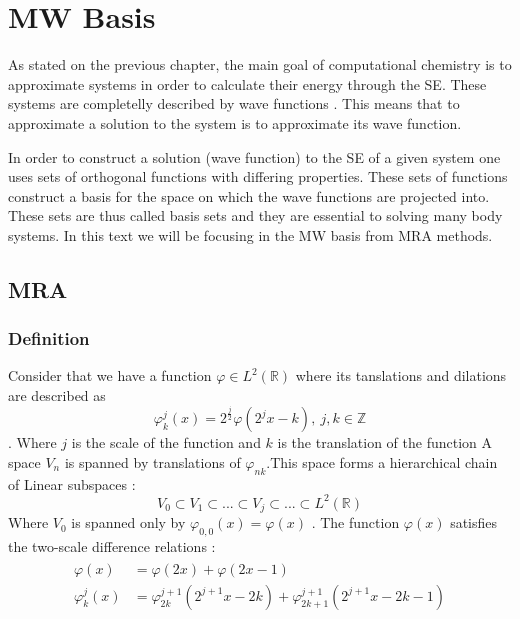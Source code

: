 \documentclass[../master_thesis.tex]{subfiles}
\begin{document}
\chapter{\ac{MW} Basis}
As stated on the previous chapter, the main goal of computational chemistry is
to approximate systems in order to calculate their energy through the \newline \ac{SE}. %
These systems are completelly described by wave functions \cite{Cohen:1973}.
This means that to approximate a solution to the system is to approximate its
wave function.

In order to construct a solution (wave function) to the \ac{SE} of a given
system one uses sets of orthogonal functions with differing properties. These
sets of functions construct a basis for the space on which the wave functions
are projected into. These sets are thus called basis sets \cite{Cramer:2004}
and they are essential to solving many body systems. In this text we will be
focusing in the \ac{MW} basis from \ac{MRA} methods.

\section{\ac{MRA}}
\subsection{Definition}
Consider that we have a function $\varphi \in L^2(\mathbb{R})$ where its tanslations
and dilations are described as \cite{Schneider:2007}
\begin{equation}
  \varphi^j_k(x) = 2^{\frac{j}{2}}\varphi(2^jx - k),\  j,k \in \mathbb{Z}
\end{equation}.
Where $j$ is the scale of the function and $k$ is the translation of the function
\cite{Sorland}
A space $V_n$ is spanned by translations of $\varphi_{nk}$.This space forms a
hierarchical chain of Linear
subspaces \cite{Beylkin:MRA}:
\begin{equation}
  V_0 \subset V_1 \subset ... \subset V_j \subset ... \subset L^2(\mathbb{R})\label{eq:seqsubspace}
\end{equation}
Where $V_0$ is spanned only by $\varphi_{0,0}(x)=\varphi(x)$ \cite{Sorland}.
The function $\varphi(x)$ satisfies the two-scale difference relations \cite{Beylkin:MRA, Schneider:2007, Sorland}:
\begin{align}
  \begin{split}
    \varphi(x) &= \varphi(2x) + \varphi(2x - 1)\\
    \varphi^j_k(x) &= \varphi^{j+1}_{2k}(2^{j+1}x - 2k) + \varphi^{j+1}_{2k+1}(2^{j+1}x - 2k - 1)
  \end{split}
\end{align}
\end{document}

